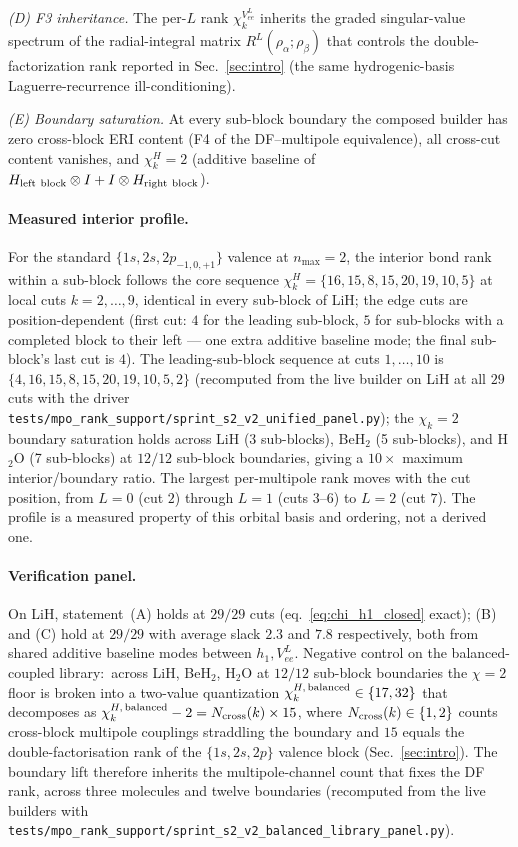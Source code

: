 \documentclass[aps,pra,twocolumn,superscriptaddress,longbibliography]{revtex4-2}
\begin{document}
\emph{(D) F3 inheritance.}  The per-$L$ rank $\chi_k^{V_{ee}^L}$
inherits the graded singular-value spectrum of the radial-integral
matrix $R^L(\rho_\alpha; \rho_\beta)$ that controls the
double-factorization rank reported in Sec.~\ref{sec:intro} (the same
hydrogenic-basis Laguerre-recurrence ill-conditioning).

\emph{(E) Boundary saturation.}  At every sub-block boundary the
composed builder has zero cross-block ERI content (F4 of the
DF--multipole equivalence), all cross-cut content vanishes, and
$\chi_k^H = 2$ (additive baseline of $H_{\rm left\ block} \otimes I
+ I \otimes H_{\rm right\ block}$).

\paragraph*{Measured interior profile.}
For the standard $\{1s, 2s, 2p_{-1,0,+1}\}$ valence at $n_{\max}=2$,
the interior bond rank within a sub-block follows the core
sequence $\chi_k^H = \{16, 15, 8, 15, 20, 19, 10, 5\}$ at local cuts $k =
2, \ldots, 9$, identical in every sub-block of LiH; the edge cuts are
position-dependent (first cut: $4$ for the leading sub-block, $5$ for
sub-blocks with a completed block to their left --- one extra additive
baseline mode; the final sub-block's last cut is $4$).  The
leading-sub-block sequence at cuts
$1,\ldots,10$ is $\{4, 16, 15, 8, 15, 20, 19, 10, 5, 2\}$
(recomputed from the live builder on LiH at all $29$ cuts with the driver
\texttt{tests/mpo\_rank\_support/sprint\_s2\_v2\_unified\_panel.py}); the
$\chi_k = 2$ boundary saturation holds across LiH
(3 sub-blocks), BeH$_2$ (5 sub-blocks), and H$_2$O (7 sub-blocks) at
$12/12$ sub-block boundaries, giving a $10\times$ maximum
interior/boundary ratio.  The largest per-multipole rank moves with
the cut position, from $L=0$ (cut $2$) through $L=1$ (cuts $3$--$6$) to
$L=2$ (cut $7$).  The profile is a measured property of this orbital
basis and ordering, not a derived one.

\paragraph*{Verification panel.}
On LiH, statement~(A) holds at $29/29$ cuts
(eq.~\eqref{eq:chi_h1_closed} exact); (B) and (C) hold at $29/29$
with average slack $2.3$ and $7.8$ respectively, both from shared
additive baseline modes between $h_1, V_{ee}^L$.  Negative control on
the balanced-coupled library:\ across LiH, BeH$_2$, H$_2$O at $12/12$
sub-block boundaries the $\chi = 2$ floor is broken into a
two-value quantization $\chi_k^{H,\,{\rm balanced}} \in \{17, 32\}$ that
decomposes as $\chi_k^{H,\,{\rm balanced}} - 2 = N_{\rm cross}(k)
\times 15$, where $N_{\rm cross}(k) \in \{1, 2\}$ counts cross-block
multipole couplings straddling the boundary and $15$ equals the
double-factorisation rank of the $\{1s, 2s, 2p\}$ valence block
(Sec.~\ref{sec:intro}).  The boundary lift therefore
inherits the multipole-channel count that fixes the DF rank, across
three molecules and twelve boundaries (recomputed from the live
builders with
\texttt{tests/mpo\_rank\_support/sprint\_s2\_v2\_balanced\_library\_panel.py}).
\end{document}
